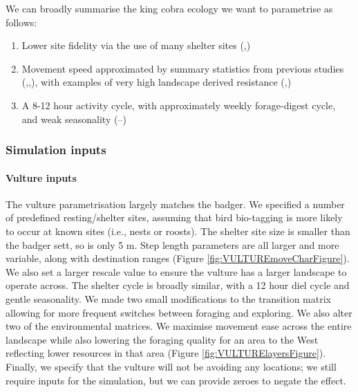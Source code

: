 \documentclass[10pt,a4paper]{article}
\begin{document}
We can broadly summarise the king cobra ecology we want to parametrise as follows:

\begin{enumerate}
\def\labelenumi{\arabic{enumi}.}
\item
  Lower site fidelity via the use of many shelter sites (,)
\item
  Movement speed approximated by summary statistics from previous studies (,,), with examples of very high landscape derived resistance (,)
\item
  A 8-12 hour activity cycle, with approximately weekly forage-digest cycle, and weak seasonality (--)
\end{enumerate}

\subsubsection{Simulation inputs}\label{simulation-inputs}

\paragraph{Vulture inputs}\label{vulture-inputs}

The vulture parametrisation largely matches the badger.
We specified a number of predefined resting/shelter sites, assuming that bird bio-tagging is more likely to occur at known sites (i.e., nests or roosts).
The shelter site size is smaller than the badger sett, so is only 5 m.
Step length parameters are all larger and more variable, along with destination ranges (Figure \ref{fig:VULTUREmoveCharFigure}).
We also set a larger rescale value to ensure the vulture has a larger landscape to operate across.
The shelter cycle is broadly similar, with a 12 hour diel cycle and gentle seasonality.
We made two small modifications to the transition matrix allowing for more frequent switches between foraging and exploring.
We also alter two of the environmental matrices.
We maximise movement ease across the entire landscape while also lowering the foraging quality for an area to the West reflecting lower resources in that area (Figure \ref{fig:VULTURElayersFigure}).
Finally, we specify that the vulture will not be avoiding any locations; we still require inputs for the simulation, but we can provide zeroes to negate the effect.
\end{document}

